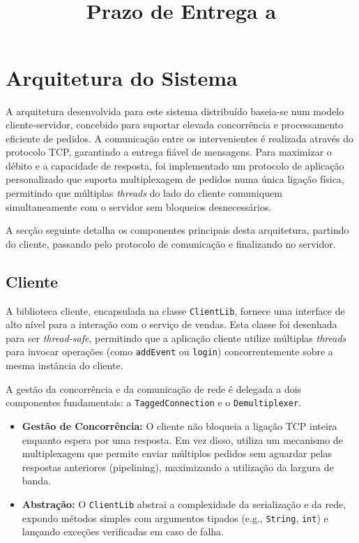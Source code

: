 \documentclass{article}
\title{%
  \vspace{2in}
  \textmd{\textbf{\hmwkClass}}\\
  \normalsize\vspace{0.1in}\small{Prazo de Entrega a \hmwkDueDate}\\
  \vspace{0.1in}
  \vspace{3in}
}
\author{\hmwkAuthorName}
\begin{document}
\maketitle

\pagebreak

\section{Arquitetura do Sistema}

A arquitetura desenvolvida para este sistema distribuído baseia-se num modelo cliente-servidor, concebido para suportar elevada concorrência e processamento eficiente de pedidos. A comunicação entre os intervenientes é realizada através do protocolo TCP, garantindo a entrega fiável de mensagens. Para maximizar o débito e a capacidade de resposta, foi implementado um protocolo de aplicação personalizado que suporta multiplexagem de pedidos numa única ligação física, permitindo que múltiplas \textit{threads} do lado do cliente comuniquem simultaneamente com o servidor sem bloqueios desnecessários.

A secção seguinte detalha os componentes principais desta arquitetura, partindo do cliente, passando pelo protocolo de comunicação e finalizando no servidor.

\subsection{Cliente}

A biblioteca cliente, encapsulada na classe \texttt{ClientLib}, fornece uma interface de alto nível para a interação com o serviço de vendas. Esta classe foi desenhada para ser \textit{thread-safe}, permitindo que a aplicação cliente utilize múltiplas \textit{threads} para invocar operações (como \texttt{addEvent} ou \texttt{login}) concorrentemente sobre a mesma instância do cliente.

A gestão da concorrência e da comunicação de rede é delegada a dois componentes fundamentais: a \texttt{TaggedConnection} e o \texttt{Demultiplexer}.

\begin{itemize}
    \item \textbf{Gestão de Concorrência:} O cliente não bloqueia a ligação TCP inteira enquanto espera por uma resposta. Em vez disso, utiliza um mecanismo de multiplexagem que permite enviar múltiplos pedidos sem aguardar pelas respostas anteriores (pipelining), maximizando a utilização da largura de banda.
    \item \textbf{Abstração:} O \texttt{ClientLib} abstrai a complexidade da serialização e da rede, expondo métodos simples com argumentos tipados (e.g., \texttt{String}, \texttt{int}) e lançando exceções verificadas em caso de falha.
\end{itemize}
\end{document}
